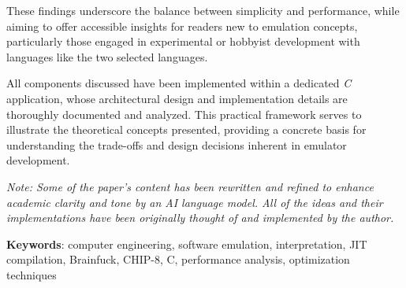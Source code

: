 \documentclass[12pt]{scrreport}
\begin{document}
\par These findings underscore the balance between simplicity and performance, while aiming to offer accessible insights for readers new to emulation concepts, particularly those engaged in experimental or hobbyist development with languages like the two selected languages.

\par All components discussed have been implemented within a dedicated \textit{C} application, whose architectural design and implementation details are thoroughly documented and analyzed. This practical framework serves to illustrate the theoretical concepts presented, providing a concrete basis for understanding the trade-offs and design decisions inherent in emulator development.

\vspace{0.5em}

\textit{Note: Some of the paper's content has been rewritten and refined to enhance academic clarity and tone by an AI language model. All of the ideas and their implementations have been originally thought of and implemented by the author.}

\vspace{0.5em}

\textbf{Keywords}: computer engineering, software emulation, interpretation, JIT compilation, Brainfuck, CHIP-8, C, performance analysis, optimization techniques

\tableofcontents
\newpage
{}








\end{document}
